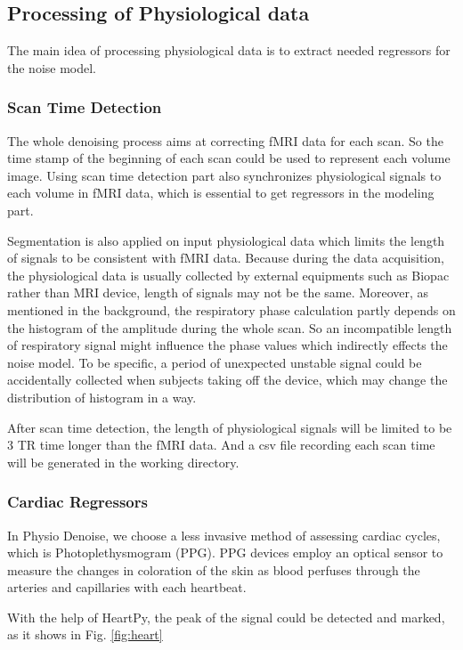 \subsection{Processing of Physiological data}
The main idea of processing physiological data is to extract needed regressors for the noise model.

\subsubsection{Scan Time Detection}
The whole denoising process aims at correcting fMRI data for each scan. 
So the time stamp of the beginning of each scan could be used to represent each volume image. 
Using scan time detection part also synchronizes physiological signals to each volume in fMRI data,
which is essential to get regressors in the modeling part.

Segmentation is also applied on input physiological data which
limits the length of signals to be consistent with fMRI data. 
Because during the data acquisition, the physiological
data is usually collected by external equipments such as Biopac rather than MRI device, 
length of signals may not be the same. Moreover, as mentioned in the background, the respiratory phase calculation 
partly depends on the histogram of the amplitude during the whole scan. So an incompatible length of 
respiratory signal might influence the phase values which indirectly effects the noise model. To be specific, 
a period of unexpected unstable signal could be accidentally collected when subjects taking off the 
device, which may change the distribution of histogram in a way.

After scan time detection, the length of physiological signals will be limited to be 3 TR time longer than the 
fMRI data. And a csv file recording each scan time will be generated in the working directory.

\subsubsection{Cardiac Regressors}

In Physio Denoise, we choose a less invasive method of assessing cardiac cycles, which is Photoplethysmogram (PPG). 
PPG devices employ an optical sensor to measure the changes in coloration of the skin as blood perfuses through the arteries and capillaries with each heartbeat. \cite{van2019heartpy}

With the help of HeartPy, the peak of the signal could be detected and marked, as it shows in Fig. \ref{fig:heart}

